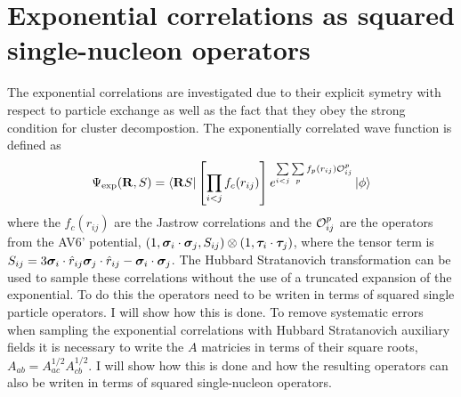 \chapter{Exponential correlations as squared single-nucleon operators}
\label{app:a12}
The exponential correlations are investigated due to their explicit symetry with respect to particle exchange as well as the fact that they obey the strong condition for cluster decompostion. The exponentially correlated wave function is defined as
\begin{equation}
   \Psi_{\text{exp}}(\mathbf{R}, S) = \left< \mathbf{R} S \right|\left[\prod\limits_{i<j}f_c(r_{ij})\right] e^{\sum\limits_{i<j}\sum\limits_{p}f_p(r_{ij})\mathcal{O}_{ij}^p}\left| \phi \right>
   \label{equ:exppsi}
\end{equation}
where the $f_c(r_{ij})$ are the Jastrow correlations and the $\mathcal{O}_{ij}^p$ are the operators from the AV6' potential, $(1,\bm{\sigma}_i\cdot\bm{\sigma}_j,S_{ij})\otimes(1,\bm{\tau}_i\cdot\bm{\tau}_j)$, where the tensor term is $S_{ij} = 3\bm{\sigma}_i\cdot\hat{r}_{ij}\bm{\sigma}_j\cdot\hat{r}_{ij}-\bm{\sigma}_i\cdot\bm{\sigma}_j$. The Hubbard Stratanovich transformation can be used to sample these correlations without the use of a truncated expansion of the exponential. To do this the operators need to be writen in terms of squared single particle operators. I will show how this is done. To remove systematic errors when sampling the exponential correlations with Hubbard Stratanovich auxiliary fields it is necessary to write the $A$ matricies in terms of their square roots, $A_{ab} = A^{1/2}_{ac}A^{1/2}_{cb}$. I will show how this is done and how the resulting operators can also be writen in terms of squared single-nucleon operators.

